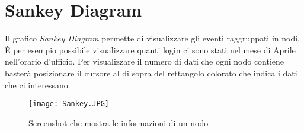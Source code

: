\section{Sankey Diagram}
Il grafico \textit{Sankey Diagram} permette di visualizzare gli eventi raggruppati in nodi.
È per esempio possibile visualizzare quanti login ci sono stati nel mese di Aprile nell'orario d'ufficio.
Per visualizzare il numero di dati che ogni nodo contiene basterà posizionare il cursore al di sopra del rettangolo colorato che indica i dati che ci interessano.

\begin{figure}[H]
    \texttt{[image: Sankey.JPG]}
    \caption{Screenshot che mostra le informazioni di un nodo}
\end{figure}
